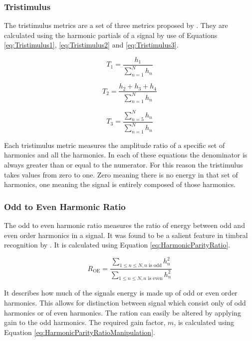 		\subsubsection*{Tristimulus}
			The tristimulus metrics are a set of three metrics proposed by \citet{pollard1982a}. They are
			calculated using the harmonic partials of a signal by use of Equations \ref{eq:Tristimulus1},
			\ref{eq:Tristimulus2} and \ref{eq:Tristimulus3}.
			
			\begin{equation}
				T_{1} = \frac{h_{1}}{\sum_{n = 1}^{N} h_{n}}
				\label{eq:Tristimulus1}
			\end{equation}

			\begin{equation}
				T_{2} = \frac{h_{2} + h_{3} + h_{4}}{\sum_{n = 1}^{N} h_{n}}
				\label{eq:Tristimulus2}
			\end{equation}

			\begin{equation}
				T_{3} = \frac{\sum_{n = 5}^{N} h_{n}}{\sum_{n = 1}^{N} h_{n}}
				\label{eq:Tristimulus3}
			\end{equation}

			Each tristimulus metric measures the amplitude ratio of a specific set of harmonics and all the
			harmonics. In each of these equations the denominator is always greater than or equal to the
			numerator. For this reason the tristimulus takes values from zero to one. Zero meaning there is no
			energy in that set of harmonics, one meaning the signal is entirely composed of those harmonics.

		\subsubsection*{Odd to Even Harmonic Ratio}
			The odd to even harmonic ratio measures the ratio of energy between odd and even order harmonics in
			a signal. It was found to be a salient feature in timbral recognition by \citet{hall2010importance}.
			It is calculated using Equation \ref{eq:HarmonicParityRatio}.
			
			\begin{equation}
				R_{\textrm{OE}} = \frac{\sum_{1 \leq n \leq N, n \textrm{ is odd}} h_{n}^{2}}
					      {\sum_{1 \leq n \leq N, n \textrm{ is even}} h_{n}^{2}}
				\label{eq:HarmonicParityRatio}
			\end{equation}

			It describes how much of the signals energy is made up of odd or even order harmonics. This allows
			for distinction between signal which consist only of odd harmonics or of even harmonics. The ration
			can easily be altered by applying gain to the odd harmonics. The required gain factor, $m$, is
			calculated using Equation \ref{eq:HarmonicParityRatioManipulation}.

